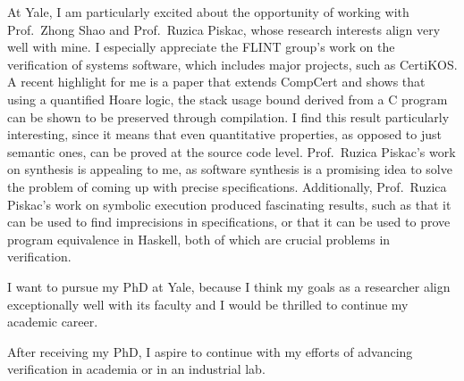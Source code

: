 \documentclass{article}
\newcommand{\school}{Yale\xspace}
\newcommand{\profOne}{Prof.\ Zhong Shao\xspace}
\newcommand{\profTwo}{Prof.\ Ruzica Piskac\xspace}
\begin{document}
At \school, I am particularly excited about the opportunity of working with \profOne and \profTwo, whose research interests align very well with mine. I especially appreciate the FLINT group's work on the verification of systems software, which includes major projects, such as CertiKOS. A recent highlight for me is a paper that extends CompCert and shows that using a quantified Hoare logic, the stack usage bound derived from a C program can be shown to be preserved through compilation. I find this result particularly interesting, since it means that even quantitative properties, as opposed to just semantic ones, can be proved at the source code level. \profTwo's work on synthesis is appealing to me, as software synthesis is a promising idea to solve the problem of coming up with precise specifications. Additionally, \profTwo's work on symbolic execution produced fascinating results, such as that it can be used to find imprecisions in specifications, or that it can be used to prove program equivalence in Haskell, both of which are crucial problems in verification.

I want to pursue my PhD at \school, because I think my goals as a researcher align exceptionally well with its faculty and I would be thrilled to continue my academic career.

After receiving my PhD, I aspire to continue with my efforts of advancing verification in academia or in an industrial lab.

\vspace{0.125in}
\end{document}
